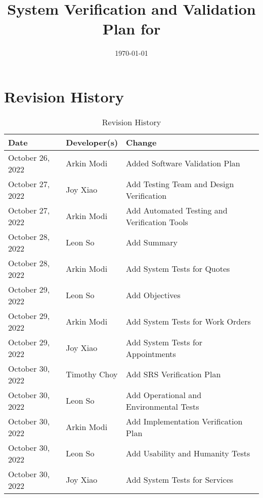 \documentclass[12pt, titlepage]{article}
\begin{document}
\title{System Verification and Validation Plan for \progname{}}
\author{\authname}
\date{\today}

\maketitle


\section{Revision History}

\begin{table}[hp]
	\caption{Revision History} \label{TblRevisionHistory}
	\begin{tabularx}{\textwidth}{llX}
		\toprule
		\textbf{Date}    & \textbf{Developer(s)} & \textbf{Change}                              \\
		\midrule
		October 26, 2022 & Arkin Modi            & Added Software Validation Plan               \\
		October 27, 2022 & Joy Xiao              & Add Testing Team and Design Verification     \\
		October 27, 2022 & Arkin Modi            & Add Automated Testing and Verification Tools \\
		October 28, 2022 & Leon So               & Add Summary                                  \\
		October 28, 2022 & Arkin Modi            & Add System Tests for Quotes                  \\
		October 29, 2022 & Leon So               & Add Objectives                               \\
		October 29, 2022 & Arkin Modi            & Add System Tests for Work Orders             \\
		October 29, 2022 & Joy Xiao              & Add System Tests for Appointments            \\
		October 30, 2022 & Timothy Choy          & Add SRS Verification Plan                    \\
		October 30, 2022 & Leon So               & Add Operational and Environmental Tests      \\
		October 30, 2022 & Arkin Modi            & Add Implementation Verification Plan         \\
		October 30, 2022 & Leon So               & Add Usability and Humanity Tests             \\
		October 30, 2022 & Joy Xiao              & Add System Tests for Services                \\

\end{tabularx}
\end{table}
\end{document}
